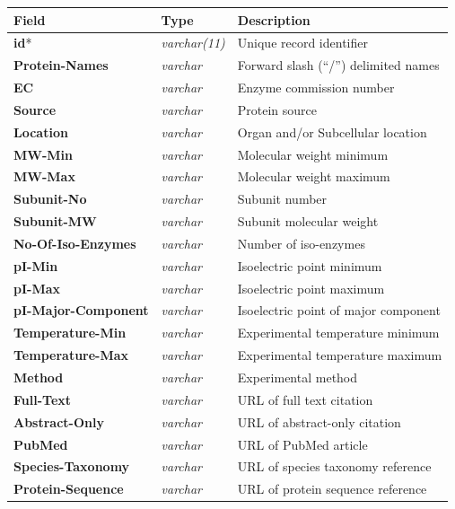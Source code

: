 \newpage
\begin{table}[H]
\centering
\begin{tabular}{| l | l | l |}
\hline
\textbf{Field} & \textbf{Type} & \textbf{Description}\\
\hline
\textbf{id}* & \textit{varchar(11)} & Unique record identifier\\
\textbf{Protein-Names} & \textit{varchar} & Forward slash (``/'') delimited names\\
\textbf{EC} & \textit{varchar} & Enzyme commission number\\
\textbf{Source} & \textit{varchar} & Protein source\\
\textbf{Location} & \textit{varchar} & Organ and/or Subcellular location\\
\textbf{MW-Min} & \textit{varchar} & Molecular weight minimum\\
\textbf{MW-Max} & \textit{varchar} & Molecular weight maximum\\
\textbf{Subunit-No} & \textit{varchar} & Subunit number\\
\textbf{Subunit-MW} & \textit{varchar} & Subunit molecular weight\\
\textbf{No-Of-Iso-Enzymes} & \textit{varchar} & Number of iso-enzymes\\
\textbf{pI-Min} & \textit{varchar} & Isoelectric point minimum\\
\textbf{pI-Max} & \textit{varchar} & Isoelectric point maximum\\
\textbf{pI-Major-Component} & \textit{varchar} & Isoelectric point of major component\\
\textbf{Temperature-Min} & \textit{varchar} & Experimental temperature minimum\\
\textbf{Temperature-Max} & \textit{varchar} & Experimental temperature maximum\\
\textbf{Method} & \textit{varchar} & Experimental method\\
\textbf{Full-Text} & \textit{varchar} & URL of full text citation\\
\textbf{Abstract-Only} & \textit{varchar} & URL of abstract-only citation\\
\textbf{PubMed} & \textit{varchar} & URL of PubMed article\\
\textbf{Species-Taxonomy} & \textit{varchar} & URL of species taxonomy reference\\
\textbf{Protein-Sequence} & \textit{varchar} & URL of protein sequence reference\\

\end{tabular}
\end{table}
